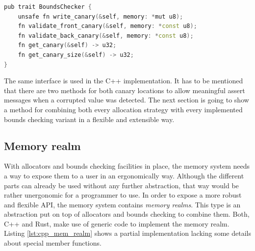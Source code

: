 \begin{lstlisting}[caption={Base trait of every bounds checker in the Rust memory system.}, label={lst:rust_bounds_check}, language={C++}]
pub trait BoundsChecker {
	unsafe fn write_canary(&self, memory: *mut u8);
	fn validate_front_canary(&self, memory: *const u8);
	fn validate_back_canary(&self, memory: *const u8);
	fn get_canary(&self) -> u32;
	fn get_canary_size(&self) -> u32;
}
\end{lstlisting}

\noindent
The same interface is used in the C++ implementation. It has to be mentioned that there are two methods for both canary locations to allow meaningful assert messages when a corrupted value was detected. The next section is going to show a method for combining both every allocation strategy with every implemented bounds checking variant in a flexible and extensible way.

\subsection{Memory realm}

With allocators and bounds checking facilities in place, the memory system needs a way to expose them to a user in an ergonomically way. Although the different parts can already be used without any further abstraction, that way would be rather unergonomic for a programmer to use. In order to expose a more robust and flexible \ac{API}, the memory system contains \textit{memory realms}. This type is an abstraction put on top of allocators and bounds checking to combine them. Both, C++ and Rust, make use of generic code to implement the memory realm. Listing \ref{lst:cpp_mem_realm} shows a partial implementation lacking some details about special member functions. \\

